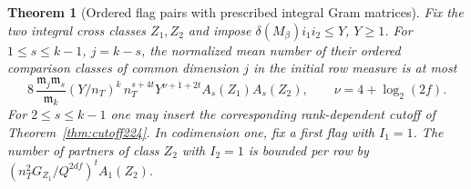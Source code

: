 \documentclass[a4paper,11pt]{article}
\newtheorem{theorem}[proposition]{Theorem}
\theoremstyle{definition}
\theoremstyle{remark}
\numberwithin{equation}{section}
\begin{document}
\begin{theorem}[Ordered flag pairs with prescribed integral Gram matrices]
\label{thm:pairs226}
Fix the two integral cross classes \(Z_1,Z_2\) and impose
\(\delta(M_\beta)i_1i_2\le Y\), \(Y\ge1\). For \(1\le s\le k-1\),
\(j=k-s\), the normalized mean number of their ordered
comparison classes of common dimension \(j\) in the initial
row measure is at most
\[
   8\,\frac{\mathfrak m_j\mathfrak m_s}{\mathfrak m_k}
      (Y/n_T)^k\,n_T^{s+4t}Y^{\nu+1+2t} A_s(Z_1)A_s(Z_2),
          \qquad \nu=4+\log_2(2f).
\]
For \(2\le s\le k-1\) one may insert the corresponding
rank-dependent cutoff of Theorem~\ref{thm:cutoff224}. In
codimension one, fix a first flag with \(I_1=1\). The number
of partners of class \(Z_2\) with \(I_2=1\) is bounded per
row by \((n_T^2G_{Z_1}/Q^{2df})^t A_1(Z_2)\).
\end{theorem}
\end{document}
